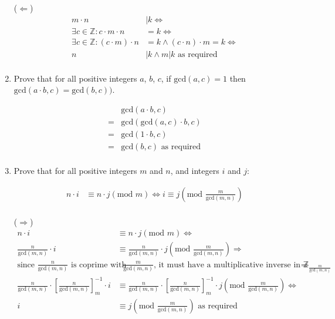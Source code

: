 \documentclass[10pt,\jkfside,a4paper]{article}
\begin{document}
\begin{enumerate}
($\Longleftarrow$)
\begin{equation}
\begin{split}
m\cdot n &| k\Longleftrightarrow\\
\exists c \in \mathbb{Z}: c\cdot m \cdot n &= k\Longleftrightarrow\\
\exists c \in \mathbb{Z}: (c\cdot m)\cdot n &= k \wedge (c\cdot n)\cdot m = k\Longleftrightarrow\\
n &| k \wedge m | k\text{ as required}\\
\end{split}
\end{equation}

\item Prove that for all positive integers $a$, $b$, $c$, if $\text{gcd}(a,c)=1$ then $\text{gcd}(a\cdot b,c) = \text{gcd}(b,c))$.

\begin{equation}\label{gcdabcgcdac}
\begin{split}
 & \text{gcd}(a\cdot b, c)\\
=& \text{gcd}(\text{gcd}(a, c) \cdot b, c)\\
=& \text{gcd}(1 \cdot b, c)\\
=& \text{gcd}(b, c)\text{ as required}\\
\end{split}
\end{equation}

\item Prove that for all positive integers $m$ and $n$, and integers $i$ and $j$:

\begin{equation}
\begin{split}
n\cdot i &\equiv n\cdot j(\text{mod } m) \Longleftrightarrow i\equiv j(\text{mod }\frac{m}{\text{gcd}(m,n)})\\
\end{split}
\end{equation}

($\Longrightarrow$)
\begin{equation}
\begin{split}
n\cdot i &\equiv n\cdot j (\text{mod } m)\Longleftrightarrow\\
\frac{n}{\text{gcd}(m, n)}\cdot i &\equiv \frac{n}{\text{gcd}(m, n)}\cdot j (\text{mod } \frac{m}{\text{gcd}(m, n)})\Longrightarrow\\
\text{since $\frac{n}{\text{gcd}(m, n)}$ is coprime with}&\text{ $\frac{m}{\text{gcd}(m, n)}$, it must have a multiplicative inverse in $\mathbb{Z}_{\frac{m}{\text{gcd}(m, n)}}$}\Longrightarrow\\
\frac{n}{\text{gcd}(m, n)} \cdot \left[\frac{n}{\text{gcd}(m, n)}\right]^{-1}_m \cdot i &\equiv \frac{n}{\text{gcd}(m, n)} \cdot \left[\frac{n}{\text{gcd}(m, n)}\right]^{-1}_m \cdot j (\text{mod } \frac{m}{\text{gcd}(m, n)})\Longleftrightarrow\\
i &\equiv j (\text{mod }\frac{m}{\text{gcd}(m, n)}) \text{ as required}\\
\end{split}
\end{equation}


\end{enumerate}
\end{document}
